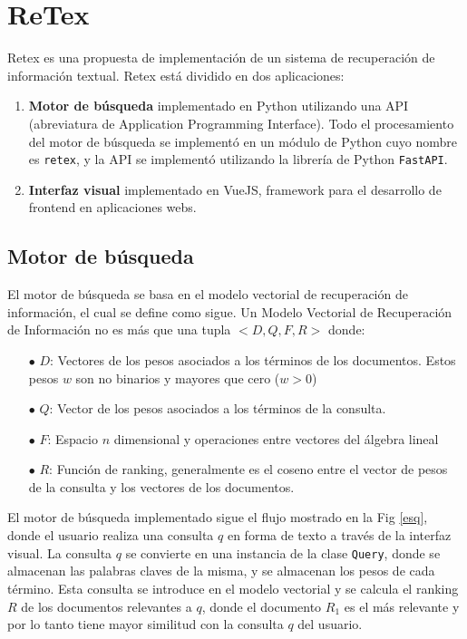 \section{ReTex}

Retex es una propuesta de implementación de un sistema de recuperación de información textual. Retex está dividido en dos aplicaciones: 

\begin{enumerate}
    \item \textbf{Motor de búsqueda} implementado en Python utilizando una API (abreviatura de Application Programming Interface). Todo el procesamiento del motor de búsqueda se implementó en un módulo de Python cuyo nombre es \verb|retex|, y la API se implementó utilizando la librería de Python \verb|FastAPI|.
    \item \textbf{Interfaz visual} implementado en VueJS, framework para el desarrollo de frontend en aplicaciones webs.
\end{enumerate}

\subsection{Motor de búsqueda}

El motor de búsqueda se basa en el modelo vectorial de recuperación de información, el cual se define como sigue. Un Modelo Vectorial de Recuperación de Información \cite{manning} no es más que una tupla $<D, Q, F, R>$ donde:

\begin{enumerate}
    \item[$\bullet$] $D$: Vectores de los pesos asociados a los términos  de los documentos. Estos pesos $w$ son no binarios y mayores que cero ($w > 0$)
    \item[$\bullet$] $Q$: Vector de los pesos asociados a los términos de la consulta.
    \item[$\bullet$] $F$: Espacio $n$ dimensional y operaciones entre vectores del álgebra lineal
    \item[$\bullet$] $R$: Función de ranking, generalmente es el coseno entre el vector de pesos de la consulta y los vectores de los documentos.
\end{enumerate}

El motor de búsqueda implementado sigue el flujo mostrado en la Fig \ref{esq}, donde el usuario realiza una consulta $q$ en forma de texto a través de la interfaz visual. La consulta $q$ se convierte en una instancia de la clase \verb|Query|, donde se almacenan las palabras claves de la misma, y se almacenan los pesos de cada término. Esta consulta se introduce en el modelo vectorial y se calcula el ranking $R$ de los documentos relevantes a $q$, donde el documento $R_1$  es el más relevante y por lo tanto tiene mayor similitud con la consulta $q$ del usuario.

